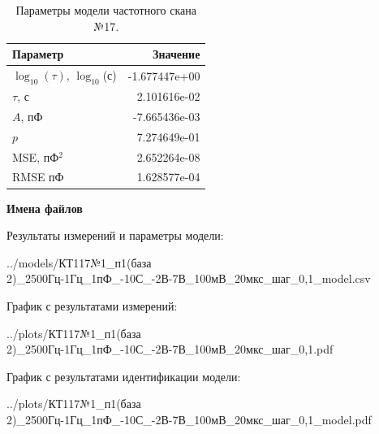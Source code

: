 \begin{table}[!ht]
    \centering
    \caption{Параметры модели частотного скана №17.}
    \begin{tabular}{|l|r|}
        \hline
        Параметр                                       & Значение                  \\ \hline
        $\log_{10}(\tau)$, $\log_{10}$(с)              & -1.677447e+00             \\ \hline
        $\tau$, с                                      & 2.101616e-02              \\ \hline
        $A$, пФ                                        & -7.665436e-03             \\ \hline
        $p$                                            & 7.274649e-01              \\ \hline
        MSE, пФ$^2$                                    & 2.652264e-08              \\ \hline
        RMSE пФ                                        & 1.628577e-04              \\ \hline
    \end{tabular}
    \label{table:frequency_scan_model_17}
\end{table}

\textbf{Имена файлов}

Результаты измерений и параметры модели:

\scriptsize../models/КТ117№1\_п1(база 2)\_2500Гц-1Гц\_1пФ\_-10С\_-2В-7В\_100мВ\_20мкс\_шаг\_0,1\_model.csv
\normalsize

График с результатами измерений:

\scriptsize../plots/КТ117№1\_п1(база 2)\_2500Гц-1Гц\_1пФ\_-10С\_-2В-7В\_100мВ\_20мкс\_шаг\_0,1.pdf
\normalsize

График с результатами идентификации модели:

\scriptsize../plots/КТ117№1\_п1(база 2)\_2500Гц-1Гц\_1пФ\_-10С\_-2В-7В\_100мВ\_20мкс\_шаг\_0,1\_model.pdf
\normalsize

